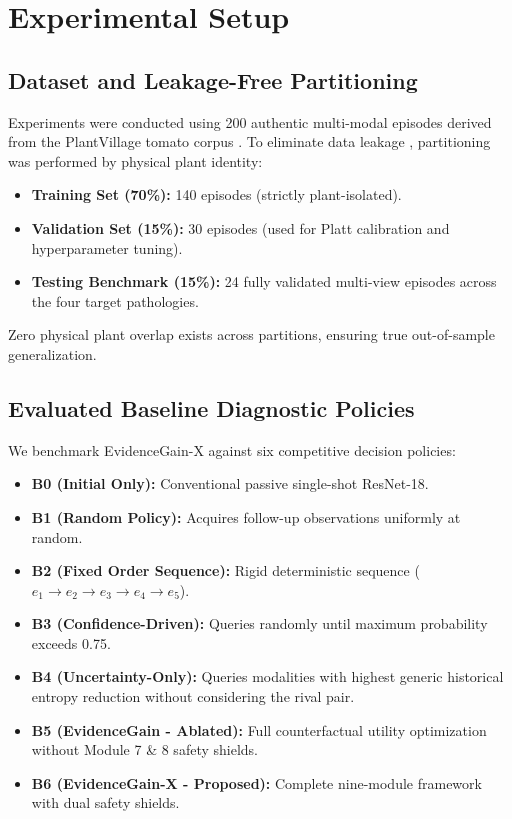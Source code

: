 \documentclass[conference]{IEEEtran}
\begin{document}
\section{Experimental Setup}

\subsection{Dataset and Leakage-Free Partitioning}
Experiments were conducted using 200 authentic multi-modal episodes derived from the PlantVillage tomato corpus \cite{hughes2015}. To eliminate data leakage \cite{ferentinos2018}, partitioning was performed by physical plant identity:
\begin{itemize}
    \item \textbf{Training Set (70\%):} 140 episodes (strictly plant-isolated).
    \item \textbf{Validation Set (15\%):} 30 episodes (used for Platt calibration and hyperparameter tuning).
    \item \textbf{Testing Benchmark (15\%):} 24 fully validated multi-view episodes across the four target pathologies.
\end{itemize}
Zero physical plant overlap exists across partitions, ensuring true out-of-sample generalization.

\subsection{Evaluated Baseline Diagnostic Policies}
We benchmark EvidenceGain-X against six competitive decision policies:
\begin{itemize}
    \item \textbf{B0 (Initial Only):} Conventional passive single-shot ResNet-18.
    \item \textbf{B1 (Random Policy):} Acquires follow-up observations uniformly at random.
    \item \textbf{B2 (Fixed Order Sequence):} Rigid deterministic sequence ($e_1 \to e_2 \to e_3 \to e_4 \to e_5$).
    \item \textbf{B3 (Confidence-Driven):} Queries randomly until maximum probability exceeds 0.75.
    \item \textbf{B4 (Uncertainty-Only):} Queries modalities with highest generic historical entropy reduction without considering the rival pair.
    \item \textbf{B5 (EvidenceGain - Ablated):} Full counterfactual utility optimization without Module 7 \& 8 safety shields.
    \item \textbf{B6 (EvidenceGain-X - Proposed):} Complete nine-module framework with dual safety shields.
\end{itemize}
\end{document}
